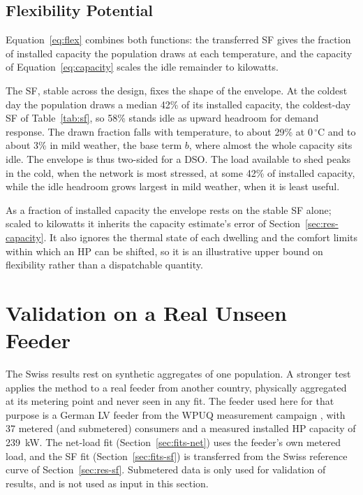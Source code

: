 \documentclass[9pt,journal,a4]{IEEEtran}
\begin{document}
\subsection{Flexibility Potential}
\label{sec:res-flex}

Equation~\eqref{eq:flex} combines both functions: the transferred SF gives the fraction of installed capacity the population draws at each temperature, and the capacity of Equation~\eqref{eq:capacity} scales the idle remainder to kilowatts.

The SF, stable across the design, fixes the shape of the envelope. At the coldest day the population draws a median 42\% of its installed capacity, the coldest-day SF of Table~\ref{tab:sf}, so 58\% stands idle as upward headroom for demand response. The drawn fraction falls with temperature, to about 29\% at 0\,$^\circ$C and to about 3\% in mild weather, the base term $b$, where almost the whole capacity sits idle. The envelope is thus two-sided for a DSO. The load available to shed peaks in the cold, when the network is most stressed, at some 42\% of installed capacity, while the idle headroom grows largest in mild weather, when it is least useful.

As a fraction of installed capacity the envelope rests on the stable SF alone; scaled to kilowatts it inherits the capacity estimate's error of Section~\ref{sec:res-capacity}. It also ignores the thermal state of each dwelling and the comfort limits within which an HP can be shifted, so it is an illustrative upper bound on flexibility rather than a dispatchable quantity.


\section{Validation on a Real Unseen Feeder}
\label{sec:validation}

The Swiss results rest on synthetic aggregates of one population. A stronger test applies the method to a real feeder from another country, physically aggregated at its metering point and never seen in any fit. The feeder used here for that purpose is a German LV feeder from the WPUQ measurement campaign \cite{Sch22}, with 37 metered (and submetered) consumers and a measured installed HP capacity of 239~kW. The net-load fit (Section~\ref{sec:fits-net}) uses the feeder's own metered load, and the SF fit (Section~\ref{sec:fits-sf}) is transferred from the Swiss reference curve of Section~\ref{sec:res-sf}. Submetered data is only used for validation of results, and is not used as input in this section.
\end{document}
